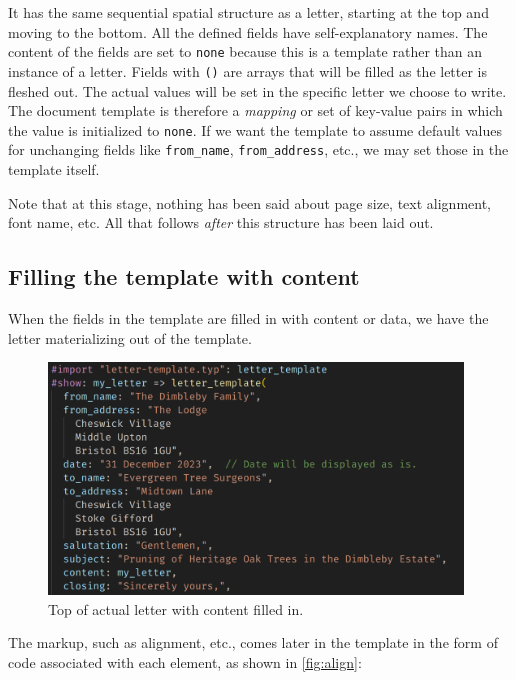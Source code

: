 \documentclass[
  a4paper,
]{article}
\begin{document}
It has the same sequential spatial structure as a letter, starting at
the top and moving to the bottom. All the defined fields have
self-explanatory names. The content of the fields are set to
\texttt{none} because this is a template rather than an instance of a
letter. Fields with \texttt{()} are arrays that will be filled as the
letter is fleshed out. The actual values will be set in the specific
letter we choose to write. The document template is therefore a
\emph{mapping} or set of key-value pairs in which the value is
initialized to \texttt{none}. If we want the template to assume default
values for unchanging fields like \texttt{from\_name},
\texttt{from\_address}, etc., we may set those in the template itself.

Note that at this stage, nothing has been said about page size, text
alignment, font name, etc. All that follows \emph{after} this structure
has been laid out.

\hypertarget{filling-the-template-with-content}{%
\subsection{Filling the template with
content}\label{filling-the-template-with-content}}

When the fields in the template are filled in with content or data, we
have the letter materializing out of the template.

\begin{figure}
\hypertarget{fig:letter}{%
\centering
\includegraphics[width=0.98\textwidth,height=\textheight]{images/letter-content-top.png}
\caption{Top of actual letter with content filled in.}\label{fig:letter}
}
\end{figure}

The markup, such as alignment, etc., comes later in the template in the
form of code associated with each element, as shown in \cref{fig:align}:
\end{document}
